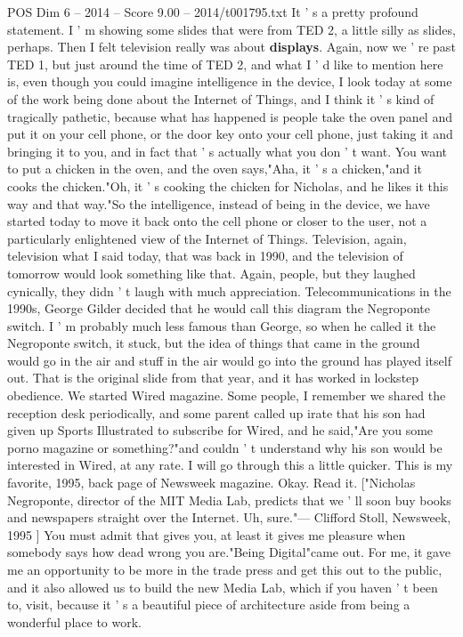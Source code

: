\begin{textsample}{POS Dim 6 – 2014 – Score 9.00 – 2014/t001795.txt}
It ' s a pretty profound statement.
I ' m showing some slides that were from TED 2, a little silly as slides, perhaps.
Then I felt television really was about \textbf{displays}.
Again, now we ' re past TED 1, but just around the time of TED 2, and what I ' d like to mention here is, even though you could imagine intelligence in the device, I look today at some of the work being done about the Internet of Things, and I think it ' s kind of tragically pathetic, because what has happened is people take the oven panel and put it on your cell phone, or the door key onto your cell phone, just taking it and bringing it to you, and in fact that ' s actually what you don ' t want.
You want to put a chicken in the oven, and the oven says,"Aha, it ' s a chicken,"and it cooks the chicken."Oh, it ' s cooking the chicken for Nicholas, and he likes it this way and that way."So the intelligence, instead of being in the device, we have started today to move it back onto the cell phone or closer to the user, not a particularly enlightened view of the Internet of Things.
Television, again, television what I said today, that was back in 1990, and the television of tomorrow would look something like that.
Again, people, but they laughed cynically, they didn ' t laugh with much appreciation.
Telecommunications in the 1990s, George Gilder decided that he would call this diagram the Negroponte switch.
I ' m probably much less famous than George, so when he called it the Negroponte switch, it stuck, but the idea of things that came in the ground would go in the air and stuff in the air would go into the ground has played itself out.
That is the original slide from that year, and it has worked in lockstep obedience.
We started Wired magazine.
Some people, I remember we shared the reception desk periodically, and some parent called up irate that his son had given up Sports Illustrated to subscribe for Wired, and he said,"Are you some porno magazine or something?"and couldn ' t understand why his son would be interested in Wired, at any rate.
I will go through this a little quicker.
This is my favorite, 1995, back page of Newsweek magazine.
Okay.
Read it. ["Nicholas Negroponte, director of the MIT Media Lab, predicts that we ' ll soon buy books and newspapers straight over the Internet.
Uh, sure."— Clifford Stoll, Newsweek, 1995 ] You must admit that gives you, at least it gives me pleasure when somebody says how dead wrong you are."Being Digital"came out.
For me, it gave me an opportunity to be more in the trade press and get this out to the public, and it also allowed us to build the new Media Lab, which if you haven ' t been to, visit, because it ' s a beautiful piece of architecture aside from being a wonderful place to work.

\end{textsample}
